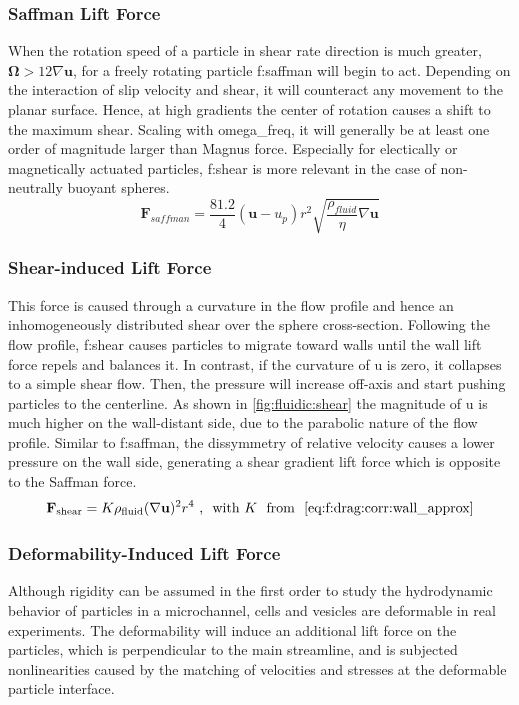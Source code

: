 \subsubsection{Saffman Lift Force}
When the rotation speed of a particle in shear rate direction is much greater, $\mathbf{\Omega}>12\nabla\mathbf{u}$, for a freely rotating particle \gls{f:saffman} will begin to act. Depending on the interaction of slip velocity and shear, it will counteract any movement to the planar surface. Hence, at high gradients the center of rotation causes a shift to the maximum shear. \newline 
Scaling with \gls{omega_freq}, it will generally be at least one order of magnitude larger than Magnus force. Especially for electically or magnetically actuated particles, \gls{f:shear} is more relevant in the case of non-neutrally buoyant spheres.\cite{lit:fluidic:inertialFluidicsForces} 
\begin{equation}	
	\mathbf{F}_{saffman} = \frac{81.2}{4} (\mathbf{u} - u_p) r^2 \sqrt{\frac{\rho_{fluid}}{\eta} \nabla \mathbf{u}} \label{eq:f:saffman}
\end{equation}

\subsubsection{Shear-induced Lift Force}
This force is caused through a curvature in the flow profile and hence an inhomogeneously distributed shear over the sphere cross-section. Following the flow profile, \gls{f:shear} causes particles to migrate toward walls until the wall lift force repels and balances it. In contrast, if the curvature of \gls{u} is zero, it collapses to a simple shear flow. Then, the pressure will increase off-axis and start pushing particles to the centerline. As shown in \cref{fig:fluidic:shear} the magnitude of \gls{u} is much higher on the wall-distant side, due to the parabolic nature of the flow profile. Similar to \gls{f:saffman},  the  dissymmetry  of  relative  velocity  causes  a  lower  pressure  on the wall side, generating a shear gradient lift force which is opposite to the Saffman force.\cite{lit:fluidic:inertialFluidicsForces} 
\begin{equation}	
	\mathbf{F}_\text{shear} = K \rho_\text{fluid} (\nabla \mathbf{u})^2 r^4\ \text{, \ with\ } K \ \text{ from }\  \cref{eq:f:drag:corr:wall_approx} \label{eq:f:shear}
\end{equation}

\subsubsection{Deformability-Induced Lift Force}
Although rigidity can be assumed in the first order to study the hydrodynamic behavior of particles in a microchannel, cells and vesicles are deformable in real experiments. The deformability  will  induce an additional  lift  force on the particles, which is perpendicular to the main streamline, and is subjected nonlinearities  caused  by  the matching   of   velocities   and   stresses   at   the   deformable   particle interface. 

